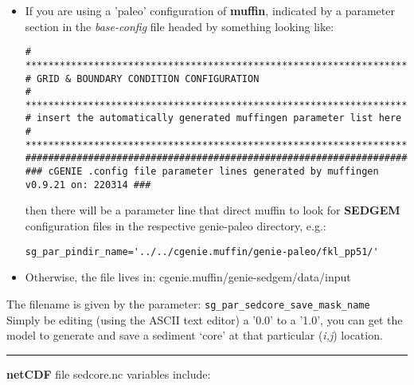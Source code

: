 \begin{itemize}[noitemsep]
\vspace{1mm}
\item
If you are using a 'paleo' configuration of \textbf{muffin}, indicated by a parameter section in the \textit{base-config} file headed by something looking like:
\footnotesize\begin{verbatim}
# *******************************************************************
# GRID & BOUNDARY CONDITION CONFIGURATION
# *******************************************************************
# insert the automatically generated muffingen parameter list here
# *******************************************************************
##################################################################################
### cGENIE .config file parameter lines generated by muffingen v0.9.21 on: 220314 ###
\end{verbatim}\normalsize
then there will be a parameter line that direct muffin to look for \textbf{SEDGEM} configuration files in the respective \textsf{\footnotesize genie-paleo } directory, e.g.:
\vspace{-1mm}\small\begin{verbatim}
sg_par_pindir_name='../../cgenie.muffin/genie-paleo/fkl_pp51/'
\end{verbatim}\normalsize\vspace{-1mm}
\vspace{1mm}
\item Otherwise, the file lives in: \textsf{\footnotesize cgenie.muffin/genie-sedgem/data/input}
\end{itemize}
\vspace{1mm}
The filename is given by the parameter: \texttt{sg\_par\_sedcore\_save\_mask\_name}
\\Simply be editing (using the ASCII text editor) a '0.0' to a '1.0', you can get the model to generate and save a sediment ‘core’ at that particular (\textit{i,j}) location.

\vspace{1mm}
\noindent\rule{4cm}{0.1mm}
\vspace{2mm}

\noindent \textbf{netCDF} file \textsf{\footnotesize sedcore.nc } variables include:

